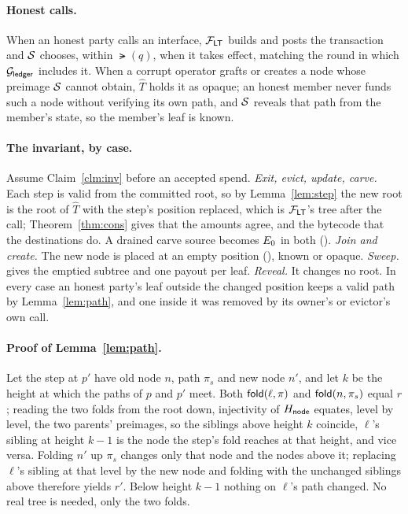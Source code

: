 \paragraph{Honest calls.} When an honest party calls an interface,
$\mathcal{F}_{\mathsf{LT}}$ builds and posts the transaction and $\mathcal{S}$ chooses, within
$\lat(q)$, when it takes effect, matching the round in which $\mathcal{G}_{\mathsf{ledger}}$
includes it. When a corrupt operator grafts or creates a node whose
preimage $\mathcal{S}$ cannot obtain, $\hat T$ holds it as opaque; an honest
member never funds such a node without verifying its own path, and
$\mathcal{S}$ reveals that path from the member's state, so the member's leaf
is known.

\paragraph{The invariant, by case.} Assume Claim~\ref{clm:inv} before an
accepted spend. \emph{Exit, evict, update, carve.} Each step is valid from
the committed root, so by Lemma~\ref{lem:step} the new root is the root
of $\hat T$ with the step's position replaced, which is $\mathcal{F}_{\mathsf{LT}}$'s tree
after the call; Theorem~\ref{thm:cons} gives that the amounts agree, and
the bytecode that the destinations do. A drained carve source becomes
$E_0$ in both (). \emph{Join and create.} The new
node is placed at an empty position (), known or
opaque. \emph{Sweep.}  gives the emptied
subtree and one payout per leaf. \emph{Reveal.} It changes no root. In
every case an honest party's leaf outside the changed position keeps a
valid path by Lemma~\ref{lem:path}, and one inside it was removed by its
owner's or evictor's own call.

\paragraph{Proof of Lemma~\ref{lem:path}.} Let the step at $p'$ have old
node $n$, path $\pi_s$ and new node $n'$, and let $k$ be the height at
which the paths of $p$ and $p'$ meet. Both $\mathsf{fold}(\ell, \pi)$ and
$\mathsf{fold}(n, \pi_s)$ equal $r$; reading the two folds from the root down,
injectivity of $H_{\mathsf{node}}$ equates, level by level, the two parents'
preimages, so the siblings above height $k$ coincide, $\ell$'s sibling at
height $k - 1$ is the node the step's fold reaches at that height, and
vice versa. Folding $n'$ up $\pi_s$ changes only that node and the nodes
above it; replacing $\ell$'s sibling at that level by the new node and
folding with the unchanged siblings above therefore yields $r'$. Below
height $k - 1$ nothing on $\ell$'s path changed. No real tree is needed,
only the two folds.


